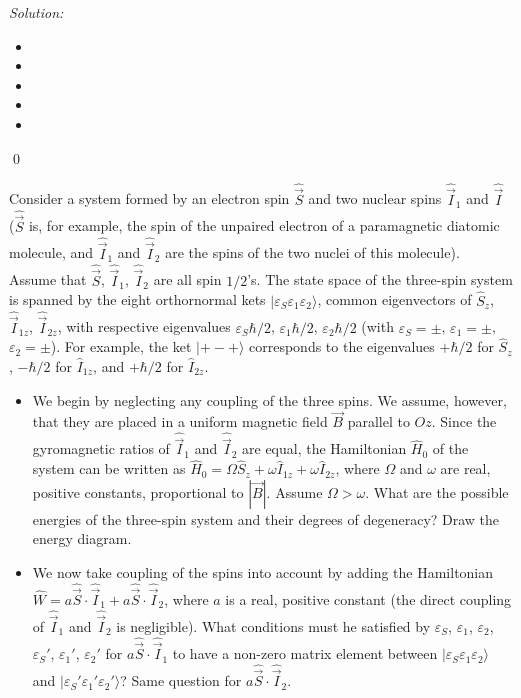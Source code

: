 \documentclass[10pt,a4paper]{article}
\newenvironment{problem}[2][Problem]{\begin{trivlist}
\item[\hskip \labelsep {\bfseries #1}\hskip \labelsep {\bfseries #2.}]}{\end{trivlist}}
\newenvironment{sol}
    {\emph{Solution:}
    }
    {
    \qed
    }
\begin{document}
\begin{sol}
\begin{itemize}
\item[(a)] 
\item[(b)] 
\item[(c)] 
\item[(d)] 
\item[(e)] 
\end{itemize}
\end{sol}

\begin{problem}{4}
[C-T Exercise 11-6] Consider a system formed by an electron spin $\hat{\vec{S}}$ and two nuclear spins $\hat{\vec{I}}_1$ and $\hat{\vec{I}}$ ($\hat{\vec{S}}$ is, for example, the spin of the unpaired electron of a paramagnetic diatomic molecule, and $\hat{\vec{I}}_1$ and $\hat{\vec{I}}_2$ are the spins of the two nuclei of this molecule).\\
Assume that $\hat{\vec{S}}$, $\hat{\vec{I}}_1$, $\hat{\vec{I}}_2$ are all spin $1/2$'s. The state space of the three-spin system is spanned by the eight orthornormal kets $|\varepsilon_S\varepsilon_1\varepsilon_2\rangle$, common eigenvectors of $\hat{S}_z$, $\hat{\vec{I}}_{1z}$, $\hat{\vec{I}}_{2z}$, with respective eigenvalues $\varepsilon_S\hbar/2$, $\varepsilon_1\hbar/2$, $\varepsilon_2\hbar/2$ (with $\varepsilon_S=\pm$, $\varepsilon_1=\pm$, $\varepsilon_2=\pm$). For example, the ket $|+-+\rangle$ corresponds to the eigenvalues $+\hbar/2$ for $\hat{S}_z$, $-\hbar/2$ for $\hat{I}_{1z}$, and $+\hbar/2$ for $\hat{I}_{2z}$.
\begin{itemize}
\item[(a)] We begin by neglecting any coupling of the three spins. We assume, however, that they are placed in a uniform magnetic field $\vec{B}$ parallel to $Oz$. Since the gyromagnetic ratios of $\hat{\vec{I}}_1$ and $\hat{\vec{I}}_2$ are equal, the Hamiltonian $\hat{H}_0$ of the system can be written as $\hat{H}_0=\Omega\hat{S}_z+\omega\hat{I}_{1z}+\omega\hat{I}_{2z}$, where $\Omega$ and $\omega$ are real, positive constants, proportional to $|\vec{B}|$. Assume $\Omega>\omega$. What are the possible energies of the three-spin system and their degrees of degeneracy? Draw the energy diagram.
\item[(b)] We now take coupling of the spins into account by adding the Hamiltonian $\hat{W}=a\hat{\vec{S}}\cdot\hat{\vec{I}}_1+a\hat{\vec{S}}\cdot\hat{\vec{I}}_2$, where $a$ is a real, positive constant (the direct coupling of $\hat{\vec{I}}_1$ and $\hat{\vec{I}}_2$ is negligible). What conditions must he satisfied by $\varepsilon_S$, $\varepsilon_1$, $\varepsilon_2$, $\varepsilon_S'$, $\varepsilon_1'$, $\varepsilon_2'$ for $a\hat{\vec{S}}\cdot\hat{\vec{I}}_1$ to have a non-zero matrix element between $|\varepsilon_S\varepsilon_1\varepsilon_2\rangle$ and $|\varepsilon_S'\varepsilon_1'\varepsilon_2'\rangle$? Same question for $a\hat{\vec{S}}\cdot\hat{\vec{I}}_2$.

\end{itemize}
\end{problem}
\end{document}
